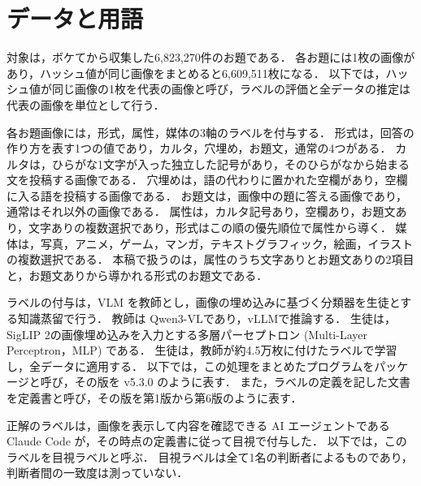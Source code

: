 \section{データと用語}
\label{sec_data}
対象は，ボケてから収集した6,823,270件のお題である．
各お題には1枚の画像があり，ハッシュ値が同じ画像をまとめると6,609,511枚になる．
以下では，ハッシュ値が同じ画像の1枚を代表の画像と呼び，ラベルの評価と全データの推定は代表の画像を単位として行う．

各お題画像には，形式，属性，媒体の3軸のラベルを付与する．
形式は，回答の作り方を表す1つの値であり，カルタ，穴埋め，お題文，通常の4つがある．
カルタは，ひらがな1文字が入った独立した記号があり，そのひらがなから始まる文を投稿する画像である．
穴埋めは，語の代わりに置かれた空欄があり，空欄に入る語を投稿する画像である．
お題文は，画像中の題に答える画像であり，通常はそれ以外の画像である．
属性は，カルタ記号あり，空欄あり，お題文あり，文字ありの複数選択であり，形式はこの順の優先順位で属性から導く．
媒体は，写真，アニメ，ゲーム，マンガ，テキストグラフィック，絵画，イラストの複数選択である．
本稿で扱うのは，属性のうち文字ありとお題文ありの2項目と，お題文ありから導かれる形式のお題文である．

ラベルの付与は，VLM を教師とし，画像の埋め込みに基づく分類器を生徒とする知識蒸留\cite{ref_kd}で行う．
教師は Qwen3-VL\cite{ref_qwen3vl}であり，vLLM\cite{ref_vllm}で推論する．
生徒は，SigLIP 2\cite{ref_siglip2}の画像埋め込みを入力とする多層パーセプトロン (Multi-Layer Perceptron，MLP) である．
生徒は，教師が約4.5万枚に付けたラベルで学習し，全データに適用する．
以下では，この処理をまとめたプログラムをパッケージと呼び，その版を v5.3.0 のように表す．
また，ラベルの定義を記した文書を定義書と呼び，その版を第1版から第6版のように表す．

正解のラベルは，画像を表示して内容を確認できる AI エージェントである Claude Code が，その時点の定義書に従って目視で付与した．
以下では，このラベルを目視ラベルと呼ぶ．
目視ラベルは全て1名の判断者によるものであり，判断者間の一致度は測っていない．
